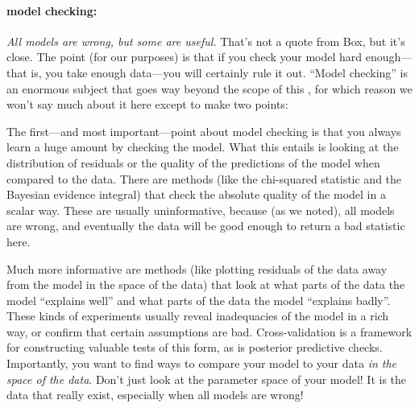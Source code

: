 \documentclass[12pt,twoside,pdftex]{article}
\begin{document}
\paragraph{model checking:}
\emph{All models are wrong, but some are useful.}
That's not a quote from Box, but it's close.
The point (for our purposes) is that if you check your model hard
enough---that is, you take enough data---you will certainly rule it
out.
``Model checking'' is an enormous subject that goes way beyond the
scope of this \documentname, for which reason we won't say much about
it here except to make two points:

The first---and most important---point about model checking is that
you always learn a huge amount by checking the model.
What this entails is looking at the distribution of residuals or the
quality of the predictions of the model when compared to the data.
There are methods (like the chi-squared statistic and the Bayesian
evidence integral) that check the absolute quality of the model in a
scalar way.
These are usually uninformative, because (as we noted), all models are
wrong, and eventually the data will be good enough to return a bad
statistic here.

Much more informative are methods (like plotting residuals of the data
away from the model in the space of the data) that look at what parts
of the data the model ``explains well'' and what parts of the data the
model ``explains badly''.
These kinds of experiments usually reveal inadequacies of the model in
a rich way, or confirm that certain assumptions are bad.
Cross-validation is a framework for constructing
valuable tests of this form, as is posterior predictive checks.
Importantly, you want to find ways to compare your model to your data
\emph{in the space of the data}.
Don't just look at the parameter space of your model!
It is the data that really exist, especially when all models are wrong!
\end{document}
